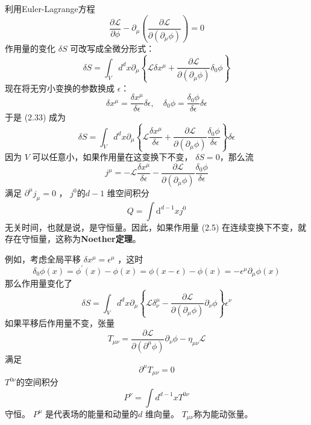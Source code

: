 利用Euler-Lagrange方程
\begin{equation}
	\frac{\partial \mathcal{L}}{\partial \phi}-\partial_{\mu}\left(\frac{\partial \mathcal{L}}{\partial\left(\partial_{\mu} \phi\right)}\right)=0
\end{equation}
作用量的变化 $\delta S$ 可改写成全微分形式：
\begin{equation}
	\delta S=\int_{V} d^{d} x \partial_{\mu}\left\{\mathcal{L} \delta x^{\mu}+\frac{\partial \mathcal{L}}{\partial\left(\partial_{\mu} \phi\right)} \delta_{0} \phi\right\}
\end{equation}
现在将无穷小变换的参数换成 $\epsilon $：
$$
	\delta x^{\mu}=\frac{\delta x^{\mu}}{\delta \epsilon} \delta \epsilon, \quad \delta_{0} \phi=\frac{\delta_{0} \phi}{\delta \epsilon} \delta \epsilon
$$
于是 (2.33) 成为
\begin{equation}
		\delta S=\int_{V} d^{d} x \partial_{\mu}\left\{\mathcal{L} \frac{\delta x^{\mu}}{\delta \epsilon}+\frac{\partial \mathcal{L}}{\partial\left(\partial_{\mu} \phi\right)} \frac{\delta_{0} \phi}{\delta \epsilon}\right\} \delta \epsilon
\end{equation}
因为 $V$ 可以任意小，如果作用量在这变换下不变， $\delta S=0 $，那么流
\begin{equation}
	j^{\mu}=-\mathcal{L} \frac{\delta x^{\mu}}{\delta \epsilon}-\frac{\partial \mathcal{L}}{\partial\left(\partial_{\mu} \phi\right)} \frac{\delta_{0} \phi}{\delta \epsilon}
\end{equation}
满足 $\partial^\mu j_\mu=0$ ， $j^0 $的$ d-1$ 维空间积分
\begin{equation}
	Q=\int \mathrm{d}^{d-1} x j^{0}
\end{equation}
无关时间，也就是说，是守恒量。因此，如果作用量 (2.5) 在连续变换下不变，就存在守恒量，这称为\textbf{Noether定理}。

例如，考虑全局平移 $\delta x^{\mu}=\epsilon^{\mu}$ ，这时
\begin{equation}
	\delta_{0} \phi(x)=\phi^{\prime}(x)-\phi(x)=\phi(x-\epsilon)-\phi(x)=-\epsilon^{\mu} \partial_{\mu} \phi(x)
\end{equation}
那么作用量变化了
\begin{equation}
	\delta S=\int_{V} d^{d} x \partial_{\mu}\left\{\mathcal{L} \delta_{\nu}^{\mu}-\frac{\partial \mathcal{L}}{\partial\left(\partial_{\mu} \phi\right)} \partial_{\nu} \phi\right\} \epsilon^{\nu}
\end{equation}
如果平移后作用量不变，张量
\begin{equation}
	T_{\mu \nu}=\frac{\partial \mathcal{L}}{\partial\left(\partial^{\mu} \phi\right)} \partial_{\nu} \phi-\eta_{\mu \nu} \mathcal{L}
\end{equation}
满足
\begin{equation}
	\partial^{\mu} T_{\mu \nu}=0
\end{equation}
$T^{0\nu} $的空间积分
\begin{equation}
	P^{\nu}=\int d^{d-1} x T^{0 \nu}
\end{equation}
守恒。 $P^\mu$ 是代表场的能量和动量的$ d$ 维向量。 $T_{\mu \nu} $称为能动张量。

